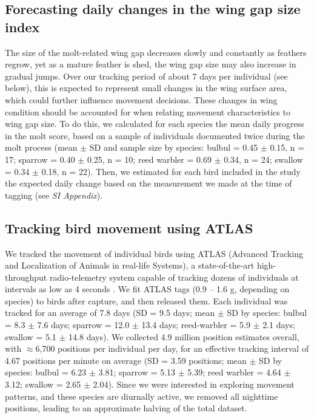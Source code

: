 \begin{refsection}
\subsection{Forecasting daily changes in the wing gap size index}

The size of the molt-related wing gap decreases slowly and constantly as feathers regrow, yet as a mature feather is shed, the wing gap size may also increase in gradual jumps.
Over our tracking period of about 7 days per individual (see below), this is expected to represent small changes in the wing surface area, which could further influence movement decisions.
These changes in wing condition should be accounted for when relating movement characteristics to wing gap size.
To do this, we calculated for each species the mean daily progress in the molt score, based on a sample of individuals documented twice during the molt process (mean $\pm$ SD and sample size by species: bulbul = 0.45 $\pm$ 0.15, n = 17; sparrow = 0.40 $\pm$ 0.25, n = 10; reed warbler = 0.69 $\pm$ 0.34, n = 24; swallow = 0.34 $\pm$ 0.18, n = 22). 
Then, we estimated for each bird included in the study the expected daily change based on the measurement we made at the time of tagging (see \textit{SI Appendix}).

\subsection{Tracking bird movement using ATLAS}

We tracked the movement of individual birds using ATLAS (Advanced Tracking and Localization of Animals in real-life Systems), a state-of-the-art high-throughput radio-telemetry system capable of tracking dozens of individuals at intervals as low as 4 seconds \citep{weiser2016,toledo2014,toledo2020,nathan2022}.
We fit ATLAS tags (0.9 -- 1.6 g, depending on species) to birds after capture, and then released them.
Each individual was tracked for an average of 7.8 days (SD = 9.5 days; mean $\pm$ SD by species:  bulbul = 8.3 $\pm$ 7.6 days; sparrow = 12.0 $\pm$ 13.4 days; reed-warbler = 5.9 $\pm$ 2.1 days; swallow = 5.1 $\pm$ 14.8 days).
We collected 4.9 million position estimates overall, with $\approx$6,700 positions per individual per day, for an effective tracking interval of 4.67 positions per minute on average (SD = 3.59 positions; mean $\pm$ SD by species:  bulbul = 6.23 $\pm$ 3.81; sparrow = 5.13 $\pm$ 5.39; reed warbler = 4.64 $\pm$ 3.12; swallow = 2.65 $\pm$ 2.04).
Since we were interested in exploring movement patterns, and these species are diurnally active, we removed all nighttime positions, leading to an approximate halving of the total dataset.


\end{refsection}
